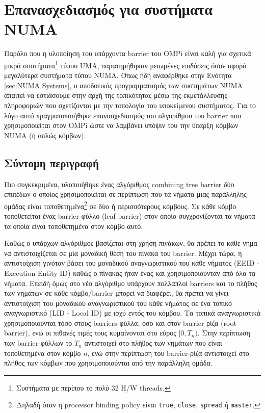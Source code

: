 \section{Επανασχεδιασμός για συστήματα NUMA}
Παρόλο που η υλοποίηση του υπάρχοντα barrier του OMPi είναι καλή για σχετικά μικρά συστήματα\footnote{Συστήματα με περίπου το πολύ 32 H/W threads.} τύπου UMA, παρατηρήθηκαν μειωμένες επιδόσεις όσον αφορά μεγαλύτερα συστήματα τύπου NUMA. Όπως ήδη αναφέρθηκε στην Ενότητα \ref{sec:NUMA Systems}, ο αποδοτικός προγραμματισμός των συστημάτων NUMA απαιτεί να εστιάσουμε στην αρχή της τοπικότητας μέσω της εκμετάλλευσης πληροφοριών που σχετίζονται με την τοπολογία του υποκείμενου συστήματος. Για το λόγο αυτό πραγματοποιήθηκε επανασχεδιασμός του αλγορίθμου του barrier που χρησιμοποιείται στον OMPi ώστε να λαμβάνει υπόψιν του την ύπαρξη κόμβων NUMA (ή απλώς κόμβων).

\subsection{Σύντομη περιγραφή}
Πιο συγκεκριμένα, υλοποιήθηκε ένας αλγόριθμος combining tree barrier δύο επιπέδων ο οποίος χρησιμοποιείται σε περίπτωση που τα νήματα μιας παράλληλης ομάδας είναι τοποθετημένα\footnote{Δηλαδή όταν η processor binding policy είναι \texttt{true}, \texttt{close}, \texttt{spread} ή \texttt{master}.} σε δύο ή περισσότερους κόμβους. Σε κάθε κόμβο τοποθετείται ένας barrier-φύλλο (leaf barrier) στον οποίο συγχρονίζονται τα νήματα τα οποία είναι τοποθετημένα στον κόμβο αυτό.

Καθώς ο υπάρχων αλγόριθμος βασίζεται στη χρήση πινάκων, θα πρέπει το κάθε νήμα να αντιστοιχίζεται σε μία μοναδική θέση του πίνακα του barrier. Μέχρι τώρα, η αντιστοίχιση γινόταν βάσει του μοναδικού αναγνωριστικού του κάθε νήματος (EEID - Execution Entity ID) καθώς ο πίνακας ήταν ένας και χρησιμοποιούνταν από όλα τα νήματα. Επειδή όμως στο νέο αλγόριθμο υπάρχουν πολλαπλοί barriers και το πλήθος των νημάτων σε κάθε κόμβο/barrier μπορεί να διαφέρει, θα πρέπει να γίνει αντιστοίχιση του μοναδικού αναγνωριστικού του κάθε νήματος σε ένα τοπικό αναγνωριστικό (LID - Local ID) με ισχύ εντός του κόμβου. Τα τοπικά αναγνωριστικά χρησιμοποιούνται τόσο στους barriers-φύλλα, όσο και στον barrier-ρίζα (root barrier), ενώ οι πιθανές τιμές τους κυμαίνονται στο εύρος $[0,T_n)$. Στην περίπτωση των barrier-φύλλων το $T_n$ αντιστοιχεί στο πλήθος των νημάτων που είναι τοποθετημένα στον κόμβο $n$, ενώ στην περίπτωση του barrier-ρίζα αντιστοιχεί στο πλήθος των κόμβων που χρησιμοποιούνται από την παράλληλη ομάδα.

